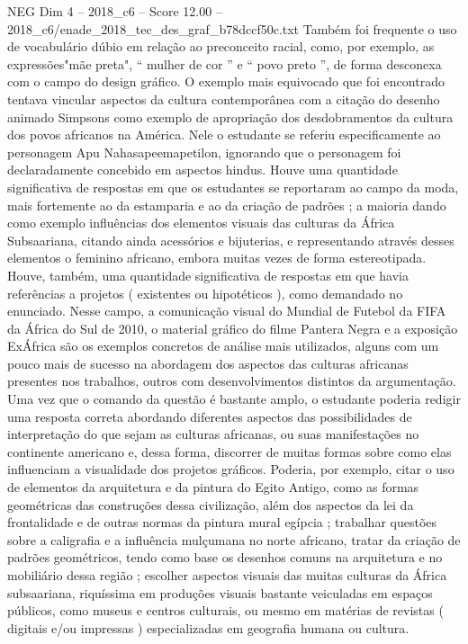 \begin{textsample}{NEG Dim 4 – 2018\_c6 – Score 12.00 – 2018\_c6/enade\_2018\_tec\_des\_graf\_b78dccf50c.txt}
Também foi frequente o uso de vocabulário dúbio em relação ao preconceito racial, como, por exemplo, as expressões"mãe preta", “ mulher de cor ” e “ povo preto ”, de forma desconexa com o campo do design gráfico.
O exemplo mais equivocado que foi encontrado tentava vincular aspectos da cultura contemporânea com a citação do desenho animado Simpsons como exemplo de apropriação dos desdobramentos da cultura dos povos africanos na América.
Nele o estudante se referiu especificamente ao personagem Apu Nahasapeemapetilon, ignorando que o personagem foi declaradamente concebido em aspectos hindus.
Houve uma quantidade significativa de respostas em que os estudantes se reportaram ao campo da moda, mais fortemente ao da estamparia e ao da criação de padrões ; a maioria dando como exemplo influências dos elementos visuais das culturas da África Subsaariana, citando ainda acessórios e bijuterias, e representando através desses elementos o feminino africano, embora muitas vezes de forma estereotipada.
Houve, também, uma quantidade significativa de respostas em que havia referências a projetos ( existentes ou hipotéticos ), como demandado no enunciado.
Nesse campo, a comunicação visual do Mundial de Futebol da FIFA da África do Sul de 2010, o material gráfico do filme Pantera Negra e a exposição ExÁfrica são os exemplos concretos de análise mais utilizados, alguns com um pouco mais de sucesso na abordagem dos aspectos das culturas africanas presentes nos trabalhos, outros com desenvolvimentos distintos da argumentação.
Uma vez que o comando da questão é bastante amplo, o estudante poderia redigir uma resposta correta abordando diferentes aspectos das possibilidades de interpretação do que sejam as culturas africanas, ou suas manifestações no continente americano e, dessa forma, discorrer de muitas formas sobre como elas influenciam a visualidade dos projetos gráficos.
Poderia, por exemplo, citar o uso de elementos da arquitetura e da pintura do Egito Antigo, como as formas geométricas das construções dessa civilização, além dos aspectos da lei da frontalidade e de outras normas da pintura mural egípcia ; trabalhar questões sobre a caligrafia e a influência mulçumana no norte africano, tratar da criação de padrões geométricos, tendo como base os desenhos comuns na arquitetura e no mobiliário dessa região ; escolher aspectos visuais das muitas culturas da África subsaariana, riquíssima em produções visuais bastante veiculadas em espaços públicos, como museus e centros culturais, ou mesmo em matérias de revistas ( digitais e/ou impressas ) especializadas em geografia humana ou cultura.

\end{textsample}
